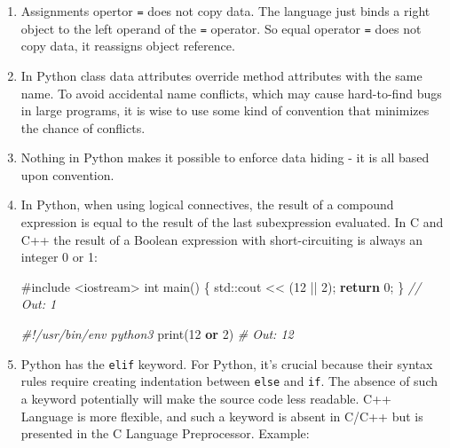 \documentclass[
]{article}
\newenvironment{Shaded}{}{}
\newcommand{\BuiltInTok}[1]{#1}
\newcommand{\CommentTok}[1]{\textcolor[rgb]{0.38,0.63,0.69}{\textit{#1}}}
\newcommand{\ControlFlowTok}[1]{\textcolor[rgb]{0.00,0.44,0.13}{\textbf{#1}}}
\newcommand{\DataTypeTok}[1]{\textcolor[rgb]{0.56,0.13,0.00}{#1}}
\newcommand{\DecValTok}[1]{\textcolor[rgb]{0.25,0.63,0.44}{#1}}
\newcommand{\ImportTok}[1]{#1}
\newcommand{\KeywordTok}[1]{\textcolor[rgb]{0.00,0.44,0.13}{\textbf{#1}}}
\newcommand{\NormalTok}[1]{#1}
\newcommand{\OperatorTok}[1]{\textcolor[rgb]{0.40,0.40,0.40}{#1}}
\newcommand{\PreprocessorTok}[1]{\textcolor[rgb]{0.74,0.48,0.00}{#1}}
\begin{document}
\begin{enumerate}
\def\labelenumi{\arabic{enumi}.}
\item
  Assignments opertor \texttt{=} does not copy data. The language just
  binds a right object to the left operand of the \texttt{=} operator.
  So equal operator \texttt{=} does not copy data, it reassigns object
  reference.
\item
  In Python class data attributes override method attributes with the
  same name. To avoid accidental name conflicts, which may cause
  hard-to-find bugs in large programs, it is wise to use some kind of
  convention that minimizes the chance of conflicts.
\item
  Nothing in Python makes it possible to enforce data hiding - it is all
  based upon convention.
\item
  In Python, when using logical connectives, the result of a compound
  expression is equal to the result of the last subexpression evaluated.
  In C and C++ the result of a Boolean expression with short-circuiting
  is always an integer 0 or 1:

\begin{Shaded}
\begin{Highlighting}[]
\PreprocessorTok{\#include }\ImportTok{\textless{}iostream\textgreater{}}
\DataTypeTok{int}\NormalTok{ main}\OperatorTok{()} \OperatorTok{\{}
    \BuiltInTok{std::}\NormalTok{cout}\OperatorTok{ \textless{}\textless{}} \OperatorTok{(}\DecValTok{12} \OperatorTok{||} \DecValTok{2}\OperatorTok{);}
    \ControlFlowTok{return} \DecValTok{0}\OperatorTok{;}
\OperatorTok{\}}
\CommentTok{// Out: 1}
\end{Highlighting}
\end{Shaded}

\begin{Shaded}
\begin{Highlighting}[]
\CommentTok{\#!/usr/bin/env python3}
\BuiltInTok{print}\NormalTok{(}\DecValTok{12} \KeywordTok{or} \DecValTok{2}\NormalTok{)}
\CommentTok{\# Out: 12}
\end{Highlighting}
\end{Shaded}
\item
  Python has the \texttt{elif} keyword. For Python, it's crucial because
  their syntax rules require creating indentation between \texttt{else}
  and \texttt{if}. The absence of such a keyword potentially will make
  the source code less readable. C++ Language is more flexible, and such
  a keyword is absent in C/C++ but is presented in the C Language
  Preprocessor. Example:


\end{enumerate}
\end{document}
